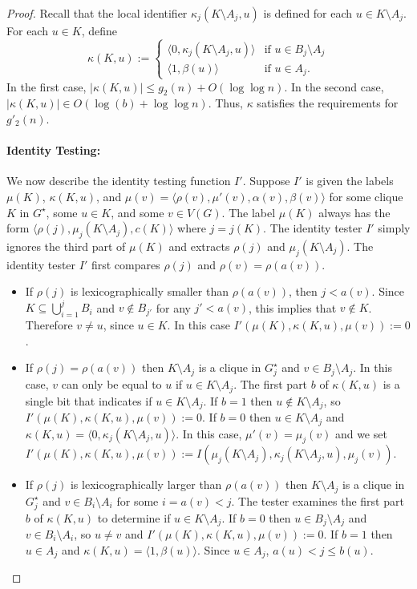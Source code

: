 \documentclass[twoside,leqno]{article}
\renewcommand{\le}{\leqslant}
\newcommand{\Oh}{O}
\begin{document}
\begin{proof}
  Recall that the local identifier $\kappa_j(K\setminus A_j,u)$ is defined for each $u\in K\setminus A_j$.
  For each $u\in K$, define
  \[
    \kappa(K,u):=
    \begin{cases}
      \langle 0,\kappa_j(K\setminus A_j,u)\rangle & \text{if $u\in B_j\setminus A_j$} \\
      \langle 1,\beta(u)\rangle                   & \text{if $u\in A_j$.}
    \end{cases}
  \]
  In the first case, $|\kappa(K,u)|\le g_2(n)+\Oh(\log\log n)$.
  In the second case, $|\kappa(K,u)|\in \Oh(\log (b)+\log\log n)$.  Thus, $\kappa$ satisfies the requirements for $g'_2(n)$.

  \paragraph{Identity Testing:}
  We now describe the identity testing function $I'$.
  Suppose $I'$ is given the labels $\mu(K)$, $\kappa(K,u)$, and $\mu(v)=\langle \rho(v),\mu'(v),\alpha(v),\beta(v)\rangle$ for some clique $K$ in $G^\star$, some $u\in K$, and some $v\in V(G)$. The label $\mu(K)$ always has the form $\langle\rho(j),\mu_j(K\setminus A_j), c(K)\rangle$ where $j=j(K)$. The identity tester $I'$ simply ignores the third part of $\mu(K)$ and extracts $\rho(j)$ and $\mu_j(K\setminus A_j)$.
  The identity tester $I'$ first compares $\rho(j)$ and $\rho(v)=\rho(a(v))$.
  \begin{itemize}
    \item If $\rho(j)$ is lexicographically smaller than $\rho(a(v))$, then $j<a(v)$.  Since $K\subseteq\bigcup_{i=1}^j B_i$ and $v\not\in B_{j'}$ for any $j'<a(v)$, this implies that $v\not\in K$.  Therefore $v\neq u$, since $u\in K$. In this case $I'(\mu(K),\kappa(K,u),\mu(v)):=0$.

    \item If $\rho(j)=\rho(a(v))$ then $K\setminus A_j$ is a clique in $G^\star_j$ and $v\in B_j\setminus A_j$.
          In this case, $v$ can only be equal to $u$ if $u\in K\setminus A_j$.
          The first part $b$ of $\kappa(K,u)$ is a single bit that indicates if $u\in K\setminus A_j$.  If $b=1$ then $u\not\in K\setminus A_j$, so $I'(\mu(K),\kappa(K,u),\mu(v)):=0$.  If $b=0$ then $u\in K\setminus A_j$ and $\kappa(K,u)=\langle 0,\kappa_j(K\setminus A_j,u)\rangle$.
          In this case, $\mu'(v)=\mu_j(v)$ and we set
          $I'(\mu(K),\kappa(K,u),\mu(v)):=I(\mu_j(K\setminus A_j),\kappa_j(K\setminus A_j,u),\mu_j(v))$.

    \item If $\rho(j)$ is lexicographically larger than $\rho(a(v))$ then $K\setminus A_j$ is a clique in $G^\star_j$ and $v\in B_i\setminus A_i$ for some $i=a(v) < j$.  The tester examines the first part $b$ of $\kappa(K,u)$ to determine if $u\in K\setminus A_j$.  If $b=0$ then  $u\in B_j\setminus A_j$ and $v\in B_i\setminus A_i$, so $u\neq v$ and $I'(\mu(K),\kappa(K,u),\mu(v)):=0$.  If $b=1$ then $u\in A_j$ and $\kappa(K,u)=\langle 1,\beta(u)\rangle$. Since $u\in A_j$, $a(u) < j\le b(u)$.


\end{itemize}
\end{proof}
\end{document}
